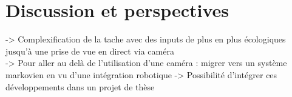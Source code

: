 
\chapter{Discussion et perspectives} %

\label{Discussion} %


-> Complexification de la tache avec des inputs de plus en plus écologiques jusqu'à une prise de vue en direct via caméra \\
-> Pour aller au delà de l'utilisation d'une caméra : migrer vers un système markovien en vu d'une intégration robotique
-> Possibilité d'intégrer ces développements dans un projet de thèse \\

